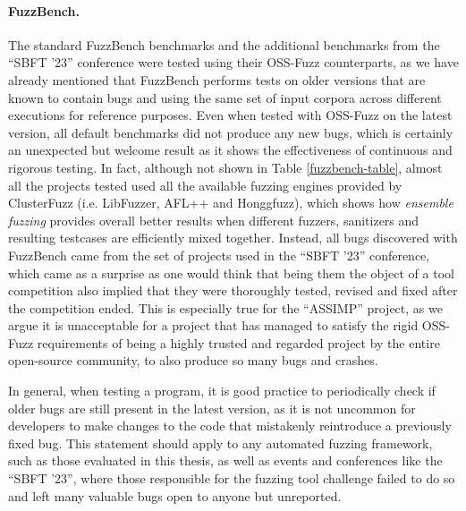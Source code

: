 \paragraph{FuzzBench.} The standard FuzzBench benchmarks and the additional benchmarks from the ``SBFT '23'' conference were tested using their OSS-Fuzz counterparts, as we have already mentioned that FuzzBench performs tests on older versions that are known to contain bugs and using the same set of input corpora across different executions for reference purposes. Even when tested with OSS-Fuzz on the latest version, all default benchmarks did not produce any new bugs, which is certainly an unexpected but welcome result as it shows the effectiveness of continuous and rigorous testing. In fact, although not shown in Table \ref{fuzzbench-table}, almost all the projects tested used all the available fuzzing engines provided by ClusterFuzz (i.e. LibFuzzer, AFL++ and Honggfuzz), which shows how \textit{ensemble fuzzing} provides overall better results when different fuzzers, sanitizers and resulting testcases are efficiently mixed together. Instead, all bugs discovered with FuzzBench came from the set of projects used in the ``SBFT '23'' conference, which came as a surprise as one would think that being them the object of a tool competition also implied that they were thoroughly tested, revised and fixed after the competition ended. This is especially true for the ``ASSIMP'' project, as we argue it is unacceptable for a project that has managed to satisfy the rigid OSS-Fuzz requirements of being a highly trusted and regarded project by the entire open-source community, to also produce so many bugs and crashes.

In general, when testing a program, it is good practice to periodically check if older bugs are still present in the latest version, as it is not uncommon for developers to make changes to the code that mistakenly reintroduce a previously fixed bug. This statement should apply to any automated fuzzing framework, such as those evaluated in this thesis, as well as events and conferences like the ``SBFT '23'', where those responsible for the fuzzing tool challenge failed to do so and left many valuable bugs open to anyone but unreported. 